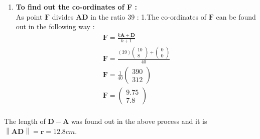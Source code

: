\documentclass{article}
\providecommand{\norm}[1]{\left\lVert#1\right\rVert}
\newcommand{\myvec}[1]{\ensuremath{\begin{pmatrix}#1\end{pmatrix}}}
\let\vec\mathbf
\begin{document}
\begin{enumerate}
	 \item \textbf{To find out the co-ordinates of F :}\\
		 As point $\vec{F}$ divides $\vec{AD}$ in the ratio 39 : 1.The co-ordinates of $\vec{F}$ can be found out in the following way : \\
		 \begin{align}
			 \vec{F} = \frac{k\vec{A} + \vec{D}}{k + 1}\\
			 \vec{F} = \frac{(39)\myvec{10\\8} + \myvec{0\\0}}{40}\\
			 \vec{F} = \frac{1}{40}\myvec{390\\312}\\
			 \vec{F} = \myvec{9.75\\7.8}\\
		 \end{align}
\end{enumerate}
		 The length of $\vec{D} - \vec{A}$ was found out in the above process and it is $\norm{\vec{AD}} = \vec{r} = 12.8cm$.
\end{document}
